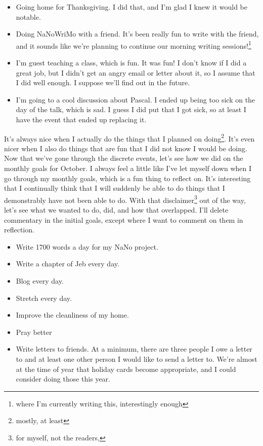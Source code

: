 \documentclass[12pt]{article}[titlepage]
\renewcommand{\,}{\textsuperscript{,}}
\begin{document}
\begin{itemize}
\item Going home for Thanksgiving. I did that, and I'm glad I knew it would be notable. 
\item Doing NaNoWriMo with a friend. It's been really fun to write with the friend, and it sounds like we're planning to continue our morning writing sessions!\footnote{where I'm currently writing this, interestingly enough} 
\item I'm guest teaching a class, which is fun. It was fun! I don't know if I did a great job, but I didn't get an angry email or letter about it, so I assume that I did well enough. I suppose we'll find out in the future. 
\item I'm going to a cool discussion about Pascal. I ended up being too sick on the day of the talk, which is sad. I guess I did put that I got sick, so at least I have the event that ended up replacing it. 
\end{itemize}
 
It's always nice when I actually do the things that I planned on doing\footnote{mostly, at least}.
It's even nicer when I also do things that are fun that I did not know I would be doing.
Now that we've gone through the discrete events, let's see how we did on the monthly goals for October.
I always feel a little like I've let myself down when I go through my monthly goals, which is a fun thing to reflect on.
It's interesting that I continually think that I will suddenly be able to do things that I demonstrably have not been able to do.
With that disclaimer\footnote{for myself, not the readers,} out of the way, let's see what we wanted to do, did, and how that overlapped.
I'll delete commentary in the initial goals, except where I want to comment on them in reflection.
 
\begin{itemize}
\item Write 1700 words a day for my NaNo project.
\item Write a chapter of Jeb every day.
\item Blog every day.
\item Stretch every day.
\item Improve the cleanliness of my home.
\item Pray better
\item Write letters to friends.
At a minimum, there are three people I owe a letter to and at least one other person I would like to send a letter to.
We're almost at the time of year that holiday cards become appropriate, and I could consider doing those this year. 
\end{itemize}
 
\end{document}
